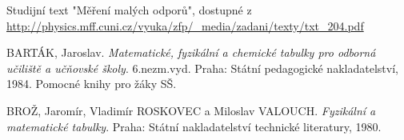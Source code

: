 \documentclass[0-protokol.tex]{subfiles}
\begin{document}
\begin{thebibliography}{}

Studijní text "Měření malých odporů", dostupné z\\ \url{http://physics.mff.cuni.cz/vyuka/zfp/_media/zadani/texty/txt_204.pdf}

BARTÁK, Jaroslav. \textit{Matematické, fyzikální a chemické tabulky pro odborná učiliště a učňovské školy}. 6.nezm.vyd. Praha: Státní pedagogické nakladatelství, 1984. Pomocné knihy pro žáky SŠ.

BROŽ, Jaromír, Vladimír ROSKOVEC a Miloslav VALOUCH. \textit{Fyzikální a matematické tabulky}. Praha: Státní nakladatelství technické literatury, 1980.

\end{thebibliography}
\end{document}

